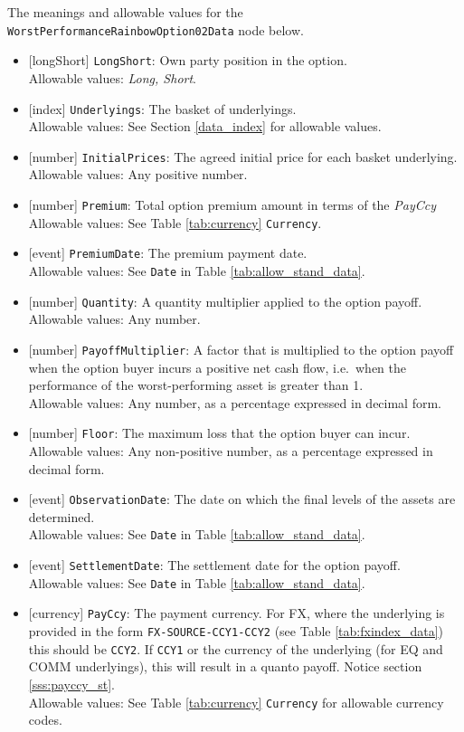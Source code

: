 The meanings and allowable values for the \lstinline!WorstPerformanceRainbowOption02Data! node below.

\begin{itemize} 
  \item{}[longShort] \lstinline!LongShort!: Own party position in the option. \\
  Allowable values: \emph{Long, Short}.
  \item{}[index] \lstinline!Underlyings!: The basket of underlyings. \\
  Allowable values: See Section \ref{data_index} for allowable values.
  \item{}[number] \lstinline!InitialPrices!: The agreed initial price for each basket underlying. \\
  Allowable values: Any positive number.
  \item{}[number] \lstinline!Premium!: Total option premium amount in terms of the \emph{PayCcy} \\
  Allowable values: See Table \ref{tab:currency} \lstinline!Currency!.
  \item{}[event] \lstinline!PremiumDate!: The premium payment date. \\
  Allowable values: See \lstinline!Date! in Table \ref{tab:allow_stand_data}.
  \item{}[number] \lstinline!Quantity!: A quantity multiplier applied to the option payoff. \\
  Allowable values: Any number.
  \item{}[number] \lstinline!PayoffMultiplier!: A factor that is multiplied to the option payoff when the option buyer incurs 
  a positive net cash flow, i.e.\ when the performance of the worst-performing asset is greater than 1. \\
  Allowable values: Any number, as a percentage expressed in decimal form.
  \item{}[number] \lstinline!Floor!: The maximum loss that the option buyer can incur. \\
  Allowable values: Any non-positive number, as a percentage expressed in decimal form.
  \item{}[event] \lstinline!ObservationDate!: The date on which the final levels of the assets are determined. \\
  Allowable values: See \lstinline!Date! in Table \ref{tab:allow_stand_data}.
  \item{}[event] \lstinline!SettlementDate!: The settlement date for the option payoff. \\
  Allowable values: See \lstinline!Date! in Table \ref{tab:allow_stand_data}.
  \item{}[currency] \lstinline!PayCcy!: The payment currency. For FX, where the underlying is provided
      in the form \lstinline!FX-SOURCE-CCY1-CCY2! (see Table \ref{tab:fxindex_data}) this should
      be \lstinline!CCY2!. If \lstinline!CCY1! or the currency of the underlying (for EQ and
      COMM underlyings), this will result in a quanto payoff. Notice section \ref{sss:payccy_st}. \\
        Allowable values: See Table \ref{tab:currency} \lstinline!Currency! for allowable currency codes.
\end{itemize}

